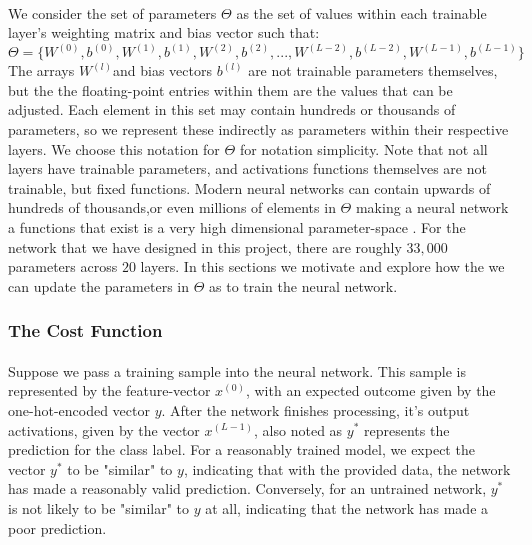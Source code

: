 \documentclass[12pt,letterpaper]{article}
\begin{document}
\paragraph*{}We consider the set of parameters $\Theta$ as the set of values within each trainable layer's weighting matrix and bias vector such that:
\begin{equation}
\label{eqn-Theta}
\Theta = \big\{
W^{(0)}, b^{(0)}, W^{(1)}, b^{(1)}, W^{(2)}, b^{(2)}, ... ,W^{(L-2)}, b^{(L-2)}, W^{(L-1)}, b^{(L-1)}
\big\}
\end{equation}
The arrays $W^{(l)}$and bias vectors $b^{(l)}$ are not trainable parameters themselves, but the the floating-point entries within them are the values that can be adjusted. Each element in this set may contain hundreds or thousands of parameters, so we represent these indirectly as parameters within their respective layers. We choose this notation for $\Theta$ for notation simplicity. Note that not all layers have trainable parameters, and activations functions themselves are not trainable, but fixed functions. Modern neural networks can contain upwards of hundreds of thousands,or even millions of elements in $\Theta$ making a neural network a functions that exist is a very high dimensional parameter-space \cite{Geron,Goodfellow,Levine}. For the network that we have designed in this project, there are roughly $33,000$ parameters across $20$ layers. In this sections we motivate and explore how the we can update the parameters in $\Theta$ as to train the neural network.


\subsubsection{The Cost Function}

\paragraph*{}Suppose we pass a training sample into the neural network. This sample is represented by the feature-vector $x^{(0)}$, with an expected outcome given by the one-hot-encoded vector $y$.  After the network finishes processing, it's output activations, given by the vector $x^{(L-1)}$, also noted as $y^*$ represents the prediction for the class label. For a reasonably trained model, we expect the vector $y^*$ to be "similar" to $y$, indicating that with the provided data, the network has made a reasonably valid prediction. Conversely, for an untrained network, $y^*$ is not likely to be "similar" to $y$ at all, indicating that the network has made a poor prediction. 
\end{document}
